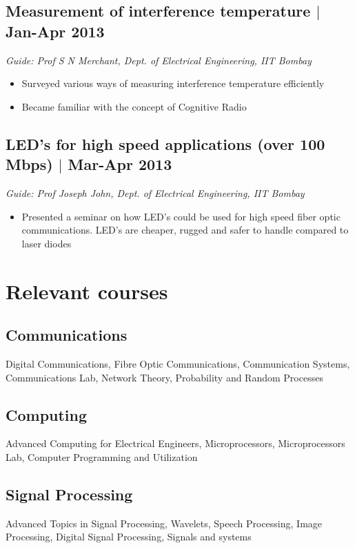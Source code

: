 \documentclass[12pt]{article}
\begin{document}
\subsection*{Measurement of interference temperature $\vert$  Jan-Apr 2013} 
\emph{Guide: Prof S N Merchant, Dept. of Electrical Engineering, IIT Bombay}
\begin{itemize}  
\item Surveyed various ways of measuring interference temperature efficiently 
\item Became familiar with the concept of Cognitive Radio
\end{itemize}
  
\subsection*{LED's for high speed applications (over 100 Mbps) $\vert$  Mar-Apr 2013}
\emph{Guide: Prof Joseph John, Dept. of Electrical Engineering, IIT Bombay}  
\begin{itemize}  
\item Presented a seminar on how LED's could be used for high speed fiber optic communications. LED's are cheaper, rugged and safer to handle compared to laser diodes 
\end{itemize}

\section*{Relevant courses}

\subsection*{Communications}
Digital Communications, Fibre Optic Communications, Communication Systems, 
Communications Lab, Network Theory, Probability and Random Processes
\subsection*{Computing}
Advanced Computing for Electrical Engineers, Microprocessors, Microprocessors Lab, Computer Programming and Utilization
\subsection*{Signal Processing}
Advanced Topics in Signal Processing, Wavelets, Speech Processing, Image Processing,
Digital Signal Processing, Signals and systems
\end{document}
